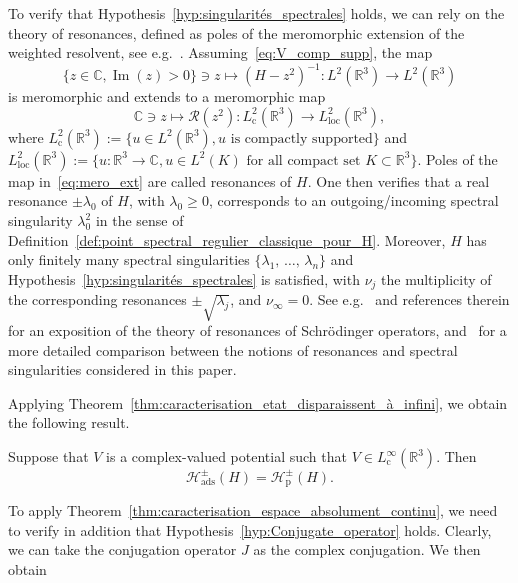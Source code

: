 \documentclass[AHL,Unicode,longabstracts,published]{cedram}
\newcommand{\Hi}{\mathcal{H}}
\newcommand{\bbC}{\mathbb{C}}
\newcommand{\R}{\mathbb{R}}
\newcommand{\rmp}{\mathrm{p}}
\newcommand{\ads}{\mathrm{ads}}
\newcommand{\rmc}{\mathrm{c}}
\newcommand{\Res}{\mathcal{R}}
\DeclareMathOperator{\im}{Im}
\newcommand*\bbC{\mathbb{C}}
\newcommand{\Hi}{\mathcal{H}}
\newcommand{\rmp}{\mathrm{p}}
\newcommand{\R}{\mathbb{R}}
\DeclareMathOperator{\im}{Im}
\begin{document}
To verify that Hypothesis~\ref{hyp:singularités_spectrales} holds, we can rely on the theory of resonances, defined as poles of the meromorphic extension of the weighted resolvent, see e.g.~\cite{DyZw19_01}. Assuming~\eqref{eq:V_comp_supp}, the map
\begin{equation*}
\{ z \in \bbC, \im(z) > 0 \} \ni z \mapsto \left(H - z^2\right)^{-1} : L^2(\R^3) \to L^2(\R^3)
\end{equation*}
is meromorphic and extends to a meromorphic map
\begin{equation}\label{eq:mero_ext}
\bbC \ni z \mapsto \Res(z^2) : L^2_{ \rmc }(\R^3) \to L^2_{ \mathrm{loc} }(\R^3), 
\end{equation}
where $L^2_{\rmc}(\R^3):=\{u\in L^2(\R^3),u\text{ is compactly supported} \}$ and $L^2_{\mathrm{loc}}(\R^3) :=\{u:\R^3\to\bbC,u\in L^2(K) \text{ for all compact set } K \subset \R^3 \}$. Poles of the map in~\eqref{eq:mero_ext} are called resonances of $H$. One then verifies that a real resonance $\pm\lambda_0$ of $H$, with $\lambda_0\ge0$, corresponds to an outgoing/incoming spectral singularity $\lambda_0^2$ in the sense of Definition~\ref{def:point_spectral_regulier_classique_pour_H}. Moreover, $H$ has only finitely many spectral singularities $\{\lambda_1,\,\dots,\,\lambda_n\}$ and Hypothesis~\ref{hyp:singularités_spectrales} is satisfied, with $\nu_j$ the multiplicity of the corresponding resonances $\pm\sqrt{\lambda_j}$, and $\nu_\infty=0$. See e.g.~\cite{DyZw19_01} and references therein for an exposition of the theory of resonances of Schr\"odinger operators, and~\cite[Section~6]{FaFr18_01} for a more detailed comparison between the notions of resonances and spectral singularities considered in this paper.

Applying Theorem~\ref{thm:caracterisation_etat_disparaissent_à_infini}, we obtain the following result.

\begin{prop}\label{prop:schr_ads}
Suppose that $V$ is a complex-valued potential such that $V \in L^\infty_{ \rmc }(\R^3)$. Then
\begin{equation*}
\Hi^\pm_{\ads}(H)=\Hi_{\rmp}^\pm(H).
\end{equation*}
\end{prop}

To apply Theorem~\ref{thm:caracterisation_espace_absolument_continu}, we need to verify in addition that Hypothesis~\ref{hyp:Conjugate_operator} holds. Clearly, we can take the conjugation operator $J$ as the complex conjugation. We then obtain
\end{document}
